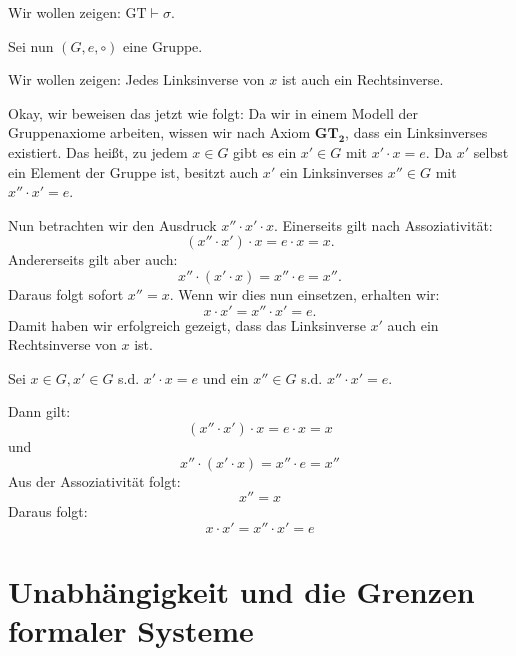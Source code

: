 \begin{math-stroke}

Wir wollen zeigen: $\text{GT} \vdash \sigma$.

Sei nun $(G, e, \circ)$ eine Gruppe.

Wir wollen zeigen: Jedes Linksinverse von $x$ ist auch ein Rechtsinverse.
\end{math-stroke}

\begin{spoken-clean}[00:53:36 - 00:57:27]
Okay, wir beweisen das jetzt wie folgt: Da wir in einem Modell der Gruppenaxiome arbeiten, wissen wir nach Axiom $\textbf{GT}_\textbf{2}$, dass ein Linksinverses existiert. Das heißt, zu jedem $x \in G$ gibt es ein $x' \in G$ mit $x' \cdot x = e$. Da $x'$ selbst ein Element der Gruppe ist, besitzt auch $x'$ ein Linksinverses $x'' \in G$ mit $x'' \cdot x' = e$.

Nun betrachten wir den Ausdruck $x'' \cdot x' \cdot x$. Einerseits gilt nach Assoziativität:
\[ (x'' \cdot x') \cdot x = e \cdot x = x. \]
Andererseits gilt aber auch:
\[ x'' \cdot (x' \cdot x) = x'' \cdot e = x''. \]
Daraus folgt sofort $x'' = x$. Wenn wir dies nun einsetzen, erhalten wir:
\[ x \cdot x' = x'' \cdot x' = e. \]
Damit haben wir erfolgreich gezeigt, dass das Linksinverse $x'$ auch ein Rechtsinverse von $x$ ist.
\end{spoken-clean}

\begin{math-stroke}
\begin{short-proof}
Sei $x \in G, x' \in G$ s.d. $x' \cdot x = e$ und ein $x'' \in G$ s.d. $x'' \cdot x' = e$.

Dann gilt:
\[ (x'' \cdot x') \cdot x = e \cdot x = x \]
und
\[ x'' \cdot (x' \cdot x) = x'' \cdot e = x'' \]
Aus der Assoziativität folgt:
\[ x'' = x \]
Daraus folgt:
\[ x \cdot x' = x'' \cdot x' = e \]
\end{short-proof}
\end{math-stroke}


\section{Unabhängigkeit und die Grenzen formaler Systeme}
